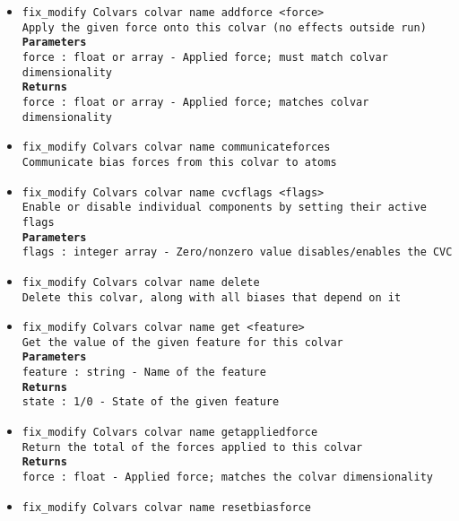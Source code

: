 \begin{itemize}
\item \texttt{fix\_modify Colvars colvar name addforce <force>}
\\
\texttt{Apply the given force onto this colvar (no effects outside run)}
\\
\texttt{\textbf{Parameters}}
\\
\texttt{force : float or array - Applied force; must match colvar dimensionality}
\\
\texttt{\textbf{Returns}}
\\
\texttt{force : float or array - Applied force; matches colvar dimensionality}
\item \texttt{fix\_modify Colvars colvar name communicateforces}
\\
\texttt{Communicate bias forces from this colvar to atoms}
\item \texttt{fix\_modify Colvars colvar name cvcflags <flags>}
\\
\texttt{Enable or disable individual components by setting their active flags}
\\
\texttt{\textbf{Parameters}}
\\
\texttt{flags : integer array - Zero/nonzero value disables/enables the CVC}
\item \texttt{fix\_modify Colvars colvar name delete}
\\
\texttt{Delete this colvar, along with all biases that depend on it}
\item \texttt{fix\_modify Colvars colvar name get <feature>}
\\
\texttt{Get the value of the given feature for this colvar}
\\
\texttt{\textbf{Parameters}}
\\
\texttt{feature : string - Name of the feature}
\\
\texttt{\textbf{Returns}}
\\
\texttt{state : 1/0 - State of the given feature}
\item \texttt{fix\_modify Colvars colvar name getappliedforce}
\\
\texttt{Return the total of the forces applied to this colvar}
\\
\texttt{\textbf{Returns}}
\\
\texttt{force : float - Applied force; matches the colvar dimensionality}
\item \texttt{fix\_modify Colvars colvar name resetbiasforce}

\end{itemize}
